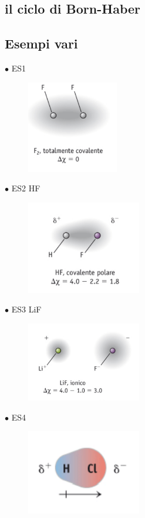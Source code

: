 \subsection{il ciclo di Born-Haber}
\subsection{Esempi vari}
$\bullet$ ES1 

\begin{figure}[htp]
    \centering
    \includegraphics[width=4cm]{immagini/F_2.png}
\end{figure}

$\bullet$ ES2 HF

\begin{figure}[htp]
    \centering
    \includegraphics[width=5cm]{immagini/HF.png}
\end{figure}

$\bullet$ ES3 LiF

\begin{figure}[htp]
    \centering
    \includegraphics[width=5cm]{immagini/LiF.png}
\end{figure}

$\bullet$ ES4

\begin{figure}[htp]
    \centering
    \includegraphics[width=5cm]{immagini/HCl.png}
\end{figure}

